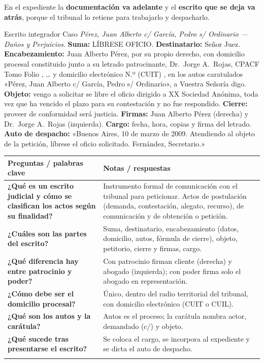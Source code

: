 \documentclass[12pt,oneside]{book}
\newcommand{\blanco}[1][1cm]{\underline{\hspace{#1}}}
\newenvironment{cornell}[1]{%
  \par\medskip\noindent{\small\bfseries Cuadro Cornell: #1}\par\smallskip
  \begin{longtable}{|>{\RaggedRight\arraybackslash}p{0.27\textwidth}|>{\RaggedRight\arraybackslash}p{0.66\textwidth}|}
  \hline
  \textbf{\small Preguntas / palabras clave} & \textbf{\small Notas / respuestas} \\ \hline\endhead
}{\end{longtable}\par\medskip}
\newcommand{\cqa}[2]{\textbf{#1} & #2 \\ \hline}
\newcommand{\cornellsummary}[1]{\multicolumn{2}{|p{0.95\textwidth}|}{\textbf{Resumen:} #1} \\ \hline}
\begin{document}
\begin{importante}
En el expediente la \textbf{documentación va adelante} y el \textbf{escrito que se deja va atrás}, porque el tribunal lo retiene para trabajarlo y despacharlo.
\end{importante}

\begin{ejemplo}{Escrito integrador}
Caso \textit{Pérez, Juan Alberto c/ García, Pedro s/ Ordinario --- Daños y Perjuicios}. \textbf{Suma:} LÍBRESE OFICIO. \textbf{Destinatario:} Señor Juez. \textbf{Encabezamiento:} Juan Alberto Pérez, por su propio derecho, con domicilio procesal constituido junto a su letrado patrocinante, Dr.~Jorge A.~Rojas, CPACF Tomo \blanco[0.6cm] Folio \blanco[0.6cm], \ldots{} y domicilio electrónico N.º (CUIT) \blanco[1.5cm], en los autos caratulados «Pérez, Juan Alberto c/ García, Pedro s/ Ordinario», a Vuestra Señoría digo. \textbf{Objeto:} vengo a solicitar se libre el oficio dirigido a XX Sociedad Anónima, toda vez que ha vencido el plazo para su contestación y no fue respondido. \textbf{Cierre:} proveer de conformidad será justicia. \textbf{Firmas:} Juan Alberto Pérez (derecha) y Dr.~Jorge A.~Rojas (izquierda). \textbf{Cargo:} fecha, hora, copias y firma del letrado. \textbf{Auto de despacho:} «Buenos Aires, 10 de marzo de 2009. Atendiendo al objeto de la petición, líbrese el oficio solicitado. Fernández, Secretario.»
\end{ejemplo}

\begin{cornell}{el escrito judicial}
\cqa{¿Qué es un escrito judicial y cómo se clasifican los actos según su finalidad?}{Instrumento formal de comunicación con el tribunal para peticionar. Actos de postulación (demanda, contestación, alegato, recurso), de comunicación y de obtención o petición.}
\cqa{¿Cuáles son las partes del escrito?}{Suma, destinatario, encabezamiento (datos, domicilio, autos, fórmula de cierre), objeto, petitorio, cierre y firmas, cargo.}
\cqa{¿Qué diferencia hay entre patrocinio y poder?}{Con patrocinio firman cliente (derecha) y abogado (izquierda); con poder firma solo el abogado en representación.}
\cqa{¿Cómo debe ser el domicilio procesal?}{Único, dentro del radio territorial del tribunal, con domicilio electrónico (CUIT o CUIL).}
\cqa{¿Qué son los autos y la carátula?}{Autos es el proceso; la carátula nombra actor, demandado (c/) y objeto.}
\cqa{¿Qué sucede tras presentarse el escrito?}{Se coloca el cargo, se incorpora al expediente y se dicta el auto de despacho.}
\cornellsummary{El escrito judicial es el instrumento cotidiano de petición, con partes formales constantes que permiten identificarlo y despacharlo. Su encabezamiento varía según haya patrocinio o poder, y su tramitación culmina en un auto de despacho que impulsa el proceso.}
\end{cornell}
\end{document}
